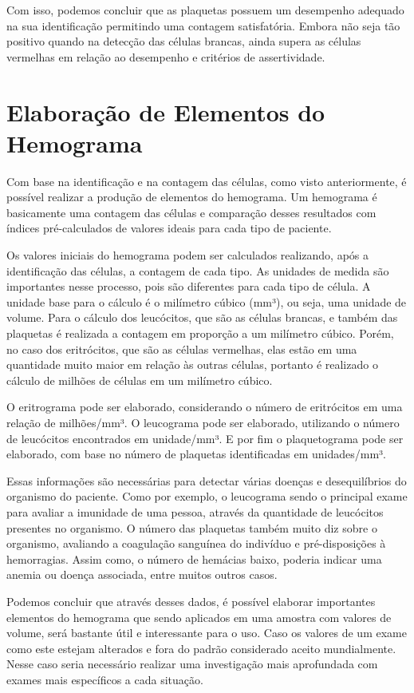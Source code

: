 Com isso, podemos concluir que as plaquetas possuem um desempenho adequado na sua identificação permitindo uma contagem satisfatória. Embora não seja tão positivo quando na detecção das células brancas, ainda supera as células vermelhas em relação ao desempenho e critérios de assertividade.

\section{Elaboração de Elementos do Hemograma}

Com base na identificação e na contagem das células, como visto anteriormente, é possível realizar a produção de elementos do hemograma. Um hemograma é basicamente uma contagem das células e comparação desses resultados com índices pré-calculados de valores ideais para cada tipo de paciente.

Os valores iniciais do hemograma podem ser calculados realizando, após a identificação das células, a contagem de cada tipo. As unidades de medida são importantes nesse processo, pois são diferentes para cada tipo de célula. A unidade base para o cálculo é o milímetro cúbico (mm³), ou seja, uma unidade de volume. Para o cálculo dos leucócitos, que são as células brancas, e também das plaquetas é realizada a contagem em proporção a um milímetro cúbico. Porém, no caso dos eritrócitos, que são as células vermelhas, elas estão em uma quantidade muito maior em relação às outras células, portanto é realizado o cálculo de milhões de células em um milímetro cúbico.

O eritrograma pode ser elaborado, considerando o número de eritrócitos em uma relação de milhões/mm³. O leucograma pode ser elaborado, utilizando o número de leucócitos encontrados em unidade/mm³. E por fim o plaquetograma pode ser elaborado, com base no número de plaquetas identificadas em unidades/mm³.

Essas informações são necessárias para detectar várias doenças e desequilíbrios do organismo do paciente. Como por exemplo, o leucograma sendo o principal exame para avaliar a imunidade de uma pessoa, através da quantidade de leucócitos presentes no organismo. O número das plaquetas também muito diz sobre o organismo, avaliando a coagulação sanguínea do indivíduo e pré-disposições à hemorragias. Assim como, o número de hemácias baixo, poderia indicar uma anemia ou doença associada, entre muitos outros casos.

Podemos concluir que através desses dados, é possível elaborar importantes elementos do hemograma que sendo aplicados em uma amostra com valores de volume, será bastante útil e interessante para o uso. Caso os valores de um exame como este estejam alterados e fora do padrão considerado aceito mundialmente. Nesse caso seria necessário realizar uma investigação mais aprofundada com exames mais específicos a cada situação.

